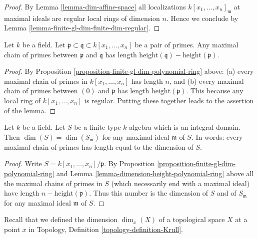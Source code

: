 \begin{proof}
By Lemma \ref{lemma-dim-affine-space}
all localizations $k[x_1, \ldots, x_n]_{\mathfrak m}$
at maximal ideals are regular local rings of dimension $n$. Hence
we conclude by Lemma \ref{lemma-finite-gl-dim-finite-dim-regular}.
\end{proof}

\begin{lemma}
\label{lemma-dimension-height-polynomial-ring}
Let $k$ be a field.
Let $\mathfrak p \subset \mathfrak q \subset k[x_1, \ldots, x_n]$
be a pair of primes.
Any maximal chain of primes between $\mathfrak p$ and $\mathfrak q$
has length $\text{height}(\mathfrak q) - \text{height}(\mathfrak p)$.
\end{lemma}

\begin{proof}
By Proposition \ref{proposition-finite-gl-dim-polynomial-ring} above:
(a) every maximal chain of primes in $k[x_1, \ldots, x_n]$
has length $n$, and (b) every maximal chain of primes
between $(0)$ and $\mathfrak p$ has length $\text{height}(\mathfrak p)$.
This because any local ring of $k[x_1, \ldots, x_n]$ is regular.
Putting these together leads to the assertion of the lemma.
\end{proof}

\begin{lemma}
\label{lemma-dimension-spell-it-out}
Let $k$ be a field.
Let $S$ be a finite type $k$-algebra which is an integral domain.
Then $\dim(S) = \dim(S_{\mathfrak m})$ for any maximal
ideal $\mathfrak m$ of $S$. In words: every maximal chain
of primes has length equal to the dimension of $S$.
\end{lemma}

\begin{proof}
Write $S = k[x_1, \ldots, x_n]/\mathfrak p$.
By Proposition \ref{proposition-finite-gl-dim-polynomial-ring} and
Lemma \ref{lemma-dimension-height-polynomial-ring} above
all the maximal chains of primes in $S$ (which necessarily end
with a maximal ideal) have length $n - \text{height}(\mathfrak p)$.
Thus this number is the dimension of $S$ and of $S_{\mathfrak m}$
for any maximal ideal $\mathfrak m$ of $S$.
\end{proof}

\noindent
Recall that we defined the
dimension $\dim_x(X)$ of a topological space $X$ at a point $x$
in Topology, Definition \ref{topology-definition-Krull}.

